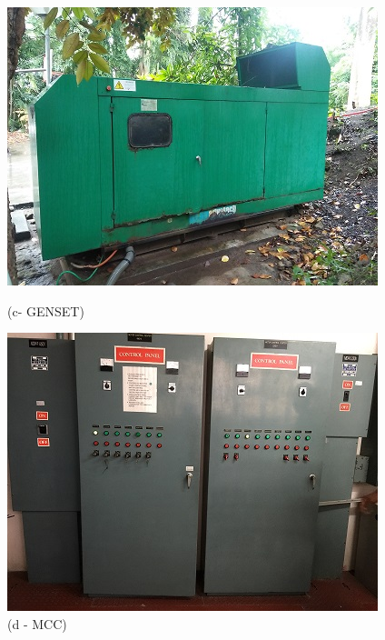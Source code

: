 \begin{figure}
\begin{minipage}[b]{0.22\linewidth}
	\end{minipage}
	\hspace{0.03cm}
	\begin{minipage}[b]{0.22\linewidth}
		\centering
		\includegraphics[width=\textwidth]{figures/asv_visual_GENSET}
		\caption*{(c- GENSET)}
	\end{minipage}
	\hspace{0.03cm}
	\begin{minipage}[b]{0.22\linewidth}
		\centering
		\includegraphics[width=\textwidth]{figures/asv_visual_mcc}
		\caption*{(d - MCC)}	
	\end{minipage}
	\hspace{0.03cm}

\end{figure}
